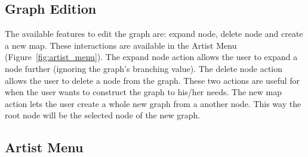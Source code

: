 \documentclass{article}
\begin{document}
    \subsection{Graph Edition} %
    \label{sub:graph_edition}
      
      The available features to edit the graph are: expand node, delete node and create a new map. These interactions are available in the Artist Menu (Figure~\ref{fig:artist_menu}).
      The expand node action allows the user to expand a node further (ignoring the graph’s branching value).
      The delete node action allows the user to delete a node from the graph.
      These two actions are useful for when the user wants to construct the graph to his/her needs.
      The new map action lets the user create a whole new graph from a another node. This way the root node will be the selected node of the new graph.

    \subsection{Artist Menu} %
    \label{sub:artist_menu}
    
\end{document}
